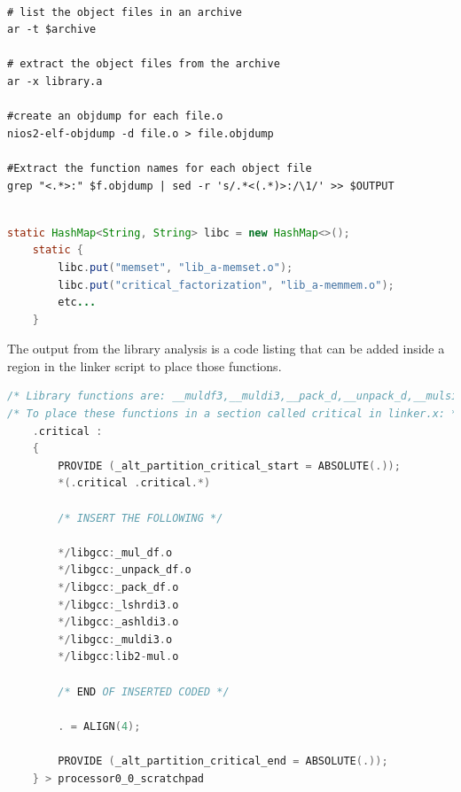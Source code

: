 \documentclass[table,11pt]{article}
\begin{document}
\begin{lstlisting}[caption={Extracting information from shared libraries},label=l:extract]

# list the object files in an archive
ar -t $archive

# extract the object files from the archive
ar -x library.a

#create an objdump for each file.o 
nios2-elf-objdump -d file.o > file.objdump

#Extract the function names for each object file
grep "<.*>:" $f.objdump | sed -r 's/.*<(.*)>:/\1/' >> $OUTPUT

\end{lstlisting}

\begin{lstlisting}[caption={Extracting information from shared libraries},label=l:jlib,language=Java]
 
static HashMap<String, String> libc = new HashMap<>();
	static {
		libc.put("memset", "lib_a-memset.o");
		libc.put("critical_factorization", "lib_a-memmem.o");
		etc...
	}

\end{lstlisting}

The output from the library analysis is a code listing that can be added inside a region in the linker script to place those functions. 

\begin{lstlisting}[caption={Placing library functions in \texttt{.critical} region},label=l:jlib,language=C]
/* Library functions are: __muldf3,__muldi3,__pack_d,__unpack_d,__mulsi3,__lshrdi3,__ashldi3 */
/* To place these functions in a section called critical in linker.x: */
    .critical :
    {
        PROVIDE (_alt_partition_critical_start = ABSOLUTE(.));
        *(.critical .critical.*)
        
        /* INSERT THE FOLLOWING */
        
        */libgcc:_mul_df.o
        */libgcc:_unpack_df.o
        */libgcc:_pack_df.o
        */libgcc:_lshrdi3.o
        */libgcc:_ashldi3.o
        */libgcc:_muldi3.o
        */libgcc:lib2-mul.o
        
        /* END OF INSERTED CODED */
        
        . = ALIGN(4);
        
        PROVIDE (_alt_partition_critical_end = ABSOLUTE(.));
    } > processor0_0_scratchpad


\end{lstlisting}
\end{document}
